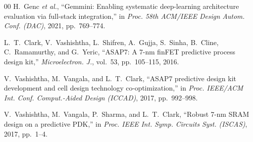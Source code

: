 \documentclass[conference]{IEEEtran}
\begin{document}
\begin{thebibliography}{00}
    H.~Genc \textit{et al.}, ``Gemmini: Enabling systematic deep-learning
    architecture evaluation via full-stack integration,'' in \textit{Proc.
    58th ACM/IEEE Design Autom. Conf. (DAC)}, 2021, pp.~769--774.

    L.~T.~Clark, V.~Vashishtha, L.~Shifren, A.~Gujja, S.~Sinha, B.~Cline,
    C.~Ramamurthy, and G.~Yeric, ``ASAP7: A 7-nm finFET predictive process
    design kit,'' \textit{Microelectron. J.}, vol.~53, pp.~105--115, 2016.

    V.~Vashishtha, M.~Vangala, and L.~T.~Clark, ``ASAP7 predictive design
    kit development and cell design technology co-optimization,'' in
    \textit{Proc. IEEE/ACM Int. Conf. Comput.-Aided Design (ICCAD)}, 2017,
    pp.~992--998.

    V.~Vashishtha, M.~Vangala, P.~Sharma, and L.~T.~Clark, ``Robust 7-nm
    SRAM design on a predictive PDK,'' in \textit{Proc. IEEE Int. Symp.
    Circuits Syst. (ISCAS)}, 2017, pp.~1--4.
\end{thebibliography}
\vspace{12pt}
\end{document}
